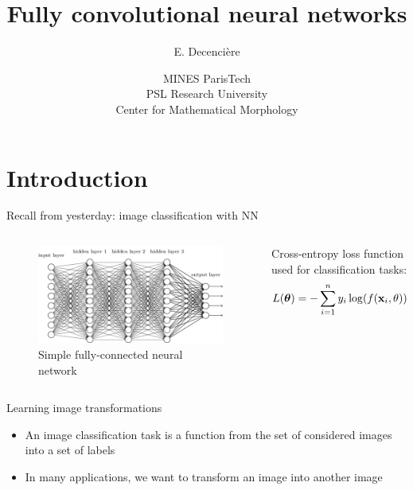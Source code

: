 \documentclass[xcolor=pdftex,dvipsnames,table,mathserif]{beamer}
\title{Fully convolutional neural networks}
\author{E. Decencière}
\date{MINES ParisTech\\
  PSL Research University\\
  Center for Mathematical Morphology
}
\begin{document}
\frame{\titlepage}


\section{Introduction}


\begin{frame}{Recall from yesterday: image classification with NN}

\begin{columns}

  \begin{column}{.5\textwidth}
    \begin{figure}[ht]
      \centering
      \includegraphics[width=\textwidth]{network.png}\\
       Simple fully-connected neural network
    \end{figure}
  \end{column}

  \begin{column}{.5\textwidth}
    Cross-entropy loss function used for classification tasks:
    \[
        L(\boldsymbol{\theta}) = -\sum\limits_{i=1}^n y_i \log( f(\mathbf{x}_i, \theta) )
    \]
  \end{column}
\end{columns}

\end{frame}


\begin{frame}{Learning image transformations}

  \begin{itemize}
  \item An image classification task is a function from the set of considered images into a set of labels
  \item In many applications, we want to transform an image into another image
  \end{itemize}

\end{frame}
\end{document}
